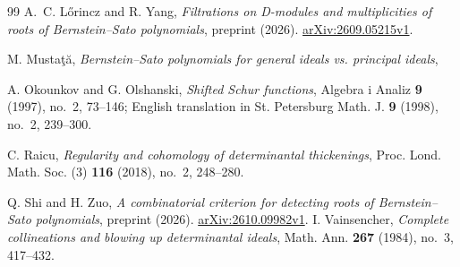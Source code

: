 \documentclass[11pt,a4paper]{article}
\numberwithin{equation}{section}
\theoremstyle{definition}
\begin{document}
\begin{thebibliography}{99}
A.~C. L\H orincz and R. Yang,
\emph{Filtrations on D-modules and multiplicities of roots of
Bernstein--Sato polynomials}, preprint (2026).
\href{https://arxiv.org/abs/2609.05215v1}{arXiv:2609.05215v1}.

M. Musta\c t\u a,
\emph{Bernstein--Sato polynomials for general ideals vs. principal ideals},


A. Okounkov and G. Olshanski,
\emph{Shifted Schur functions}, Algebra i Analiz \textbf{9} (1997),
no.~2, 73--146; English translation in St. Petersburg Math. J.
\textbf{9} (1998), no.~2, 239--300.


C. Raicu,
\emph{Regularity and cohomology of determinantal thickenings},
Proc. Lond. Math. Soc. (3) \textbf{116} (2018), no.~2, 248--280.


Q. Shi and H. Zuo,
\emph{A combinatorial criterion for detecting roots of
Bernstein--Sato polynomials}, preprint (2026).
\href{https://arxiv.org/abs/2610.09982v1}{arXiv:2610.09982v1}.
I. Vainsencher,
\emph{Complete collineations and blowing up determinantal ideals},
Math. Ann. \textbf{267} (1984), no.~3, 417--432.

\end{thebibliography}
\end{document}
